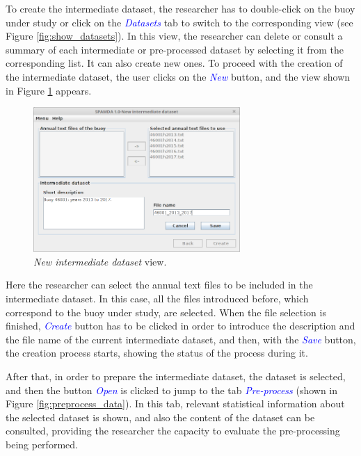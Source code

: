 \documentclass[review]{elsarticle}
\begin{document}
		To create the intermediate dataset, the researcher has to double-click on the buoy under study or click on the \textcolor{blue}{\textit{Datasets}} tab to switch to the corresponding view (see Figure \ref{fig:show_datasets}). In this view, the researcher can delete or consult a summary of each intermediate or pre-processed dataset by selecting it from the corresponding list. It can also create new ones. To proceed with the creation of the intermediate dataset, the user clicks on the \textcolor{blue}{\textit{New}} button, and the view shown in Figure \ref{fig:intermediate} appears. 
		
		\begin{figure}[ht!]
			\centering
			\includegraphics[width=0.70\textwidth]{figures/FigureNew_intermediate_dataset.png}
			\caption{\textit{New intermediate dataset} view.}\label{fig:intermediate}
		\end{figure}
		
		Here the researcher can select the annual text files to be included in the intermediate dataset. In this case, all the files introduced before, which correspond to the buoy under study, are selected. When the file selection is finished, \textcolor{blue}{\textit{Create}} button has to be clicked in order to introduce the description and the file name of the current intermediate dataset, and then, with the \textcolor{blue}{\textit{Save}} button, the creation process starts, showing the status of the process during it.
		
		After that, in order to prepare the intermediate dataset, the dataset is selected, and then the button \textcolor{blue}{\textit{Open}} is clicked to jump to the tab \textcolor{blue}{\textit{Pre-process}} (shown in Figure \ref{fig:preprocess_data}). In this tab, relevant statistical information about the selected dataset is shown, and also the content of the dataset can be consulted, providing the researcher the capacity to evaluate the pre-processing being performed.
		
\end{document}
